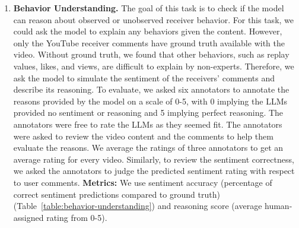 \begin{enumerate}[leftmargin=*]
    \item\textbf{Behavior Understanding.} The goal of this task is to check if the model can reason about observed or unobserved receiver behavior. For this task, we could ask the model to explain any behaviors given the content. However, only the YouTube receiver comments have ground truth available with the video. Without ground truth, we found that other behaviors, such as replay values, likes, and views, are difficult to explain by non-experts. Therefore, we ask the model to simulate the sentiment of the receivers' comments and describe its reasoning. To evaluate, we asked six annotators to annotate the reasons provided by the model on a scale of 0-5, with 0 implying the LLMs provided no sentiment or reasoning and 5 implying perfect reasoning. The annotators were free to rate the LLMs as they seemed fit. The annotators were asked to review the video content and the comments to help them evaluate the reasons. We average the ratings of three annotators to get an average rating for every video. Similarly, to review the sentiment correctness, we asked the annotators to judge the predicted sentiment rating with respect to user comments. \textbf{Metrics:} We use sentiment accuracy (percentage of correct sentiment predictions compared to ground truth) (Table~\ref{table:behavior-understanding}) and reasoning score (average human-assigned rating from 0-5).
    

\end{enumerate}
